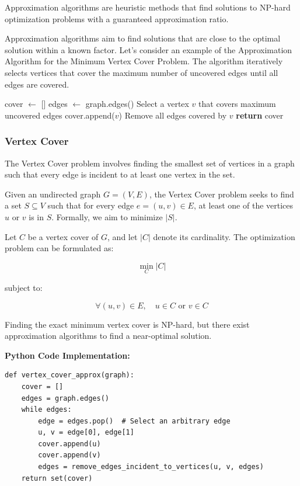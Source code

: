 Approximation algorithms are heuristic methods that find solutions to NP-hard optimization problems with a guaranteed approximation ratio.

Approximation algorithms aim to find solutions that are close to the optimal solution within a known factor. Let's consider an example of the Approximation Algorithm for the Minimum Vertex Cover Problem. The algorithm iteratively selects vertices that cover the maximum number of uncovered edges until all edges are covered.
\FloatBarrier
\begin{algorithm}
\caption{Approximation Algorithm for Minimum Vertex Cover}\label{approx_vc}
\begin{algorithmic}[1]
\State cover $\gets$ []
\State edges $\gets$ graph.edges()
    \State Select a vertex $v$ that covers maximum uncovered edges
    \State cover.append($v$)
    \State Remove all edges covered by $v$
\EndWhile
\State \textbf{return} cover
\EndProcedure
\end{algorithmic}
\end{algorithm}
\FloatBarrier

\subsubsection{Vertex Cover}

The Vertex Cover problem involves finding the smallest set of vertices in a graph such that every edge is incident to at least one vertex in the set.

Given an undirected graph \(G = (V, E)\), the Vertex Cover problem seeks to find a set \(S \subseteq V\) such that for every edge \(e = (u, v) \in E\), at least one of the vertices \(u\) or \(v\) is in \(S\). Formally, we aim to minimize \(|S|\).

Let \(C\) be a vertex cover of \(G\), and let \(|C|\) denote its cardinality. The optimization problem can be formulated as:

\[
\min_{C} |C|
\]

subject to:

\[
\forall (u, v) \in E, \quad u \in C \text{ or } v \in C
\]

Finding the exact minimum vertex cover is NP-hard, but there exist approximation algorithms to find a near-optimal solution.

\textbf{Python Code Implementation:}
\FloatBarrier
\begin{lstlisting}
def vertex_cover_approx(graph):
    cover = []
    edges = graph.edges()
    while edges:
        edge = edges.pop()  # Select an arbitrary edge
        u, v = edge[0], edge[1]
        cover.append(u)
        cover.append(v)
        edges = remove_edges_incident_to_vertices(u, v, edges)
    return set(cover)
\end{lstlisting}
\FloatBarrier

